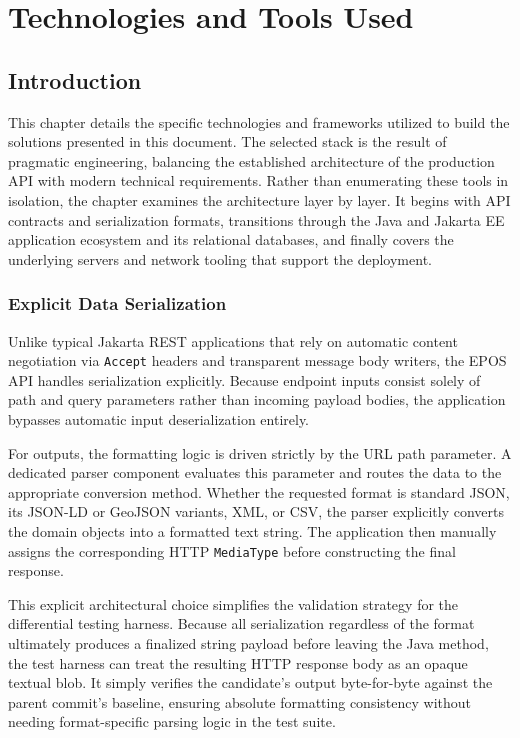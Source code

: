 \chapter{Technologies and Tools Used}
\label{chap:tecno-ferra}

\section{Introduction}
\label{chap3:sec:intro}

This chapter details the specific technologies and frameworks utilized to build
the solutions presented in this document. The selected stack is the result
of pragmatic engineering, balancing the established architecture of the production
\ac{API} with modern technical requirements. Rather than enumerating these tools
in isolation, the chapter examines the architecture layer by layer. It begins
with \ac{API} contracts and serialization formats, transitions through the Java
and Jakarta EE application ecosystem and its relational databases, and
finally covers the underlying servers and network tooling that support the
deployment.

\subsection{Explicit Data Serialization}
\label{sec:data-ser}

Unlike typical Jakarta \ac{REST} applications that rely on automatic
content negotiation via \texttt{Accept} headers and transparent message body
writers, the \ac{EPOS} \ac{API} handles serialization explicitly. Because endpoint
inputs consist solely of path and query parameters rather than incoming payload
bodies, the application bypasses automatic input deserialization entirely.

For outputs, the formatting logic is driven strictly by the \ac{URL} path
parameter. A dedicated parser component evaluates this parameter and routes the
data to the appropriate conversion method. Whether the requested format is
standard \ac{JSON}, its \ac{JSON-LD} or \ac{GeoJSON} variants, \ac{XML}, or \ac{CSV},
the parser explicitly converts the domain objects into a formatted text string.
The application then manually assigns the corresponding \ac{HTTP} \texttt{MediaType}
before constructing the final response.

This explicit architectural choice simplifies the validation strategy for
the differential testing harness. Because all serialization regardless of the
format ultimately produces a finalized string payload before leaving the Java
method, the test harness can treat the resulting \ac{HTTP} response body as an
opaque textual blob. It simply verifies the candidate's output byte-for-byte
against the parent commit's baseline, ensuring absolute formatting consistency
without needing format-specific parsing logic in the test suite.

